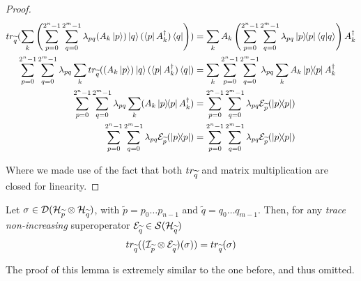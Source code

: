 \begin{proof}
\begin{align*}
\trQ(\sum_k  \left( \sum_{p = 0}^{2^n-1} \sum_{q = 0}^{2^m-1} \lambda_{pq} (A_k\ket{p})\ket{q}(\bra{p}A_k^\dagger) \bra{q} \right) )
&= \sum_k A_k\left( \sum_{p = 0}^{2^n-1} \sum_{q = 0}^{2^m-1} \lambda_{pq} \proj{p}\braket{q | q}\right)A_k^\dagger
\\
\sum_{p = 0}^{2^n-1} \sum_{q = 0}^{2^m-1} \lambda_{pq} \sum_k \trQ( (A_k\ket{p})\ket{q}(\bra{p}A_k^\dagger) \bra{q} ) 
&= \sum_k  \sum_{p = 0}^{2^n-1} \sum_{q = 0}^{2^m-1} \lambda_{pq} \sum_k  A_k \proj{p} A_k^\dagger 
\\
\sum_{p = 0}^{2^n-1} \sum_{q = 0}^{2^m-1} \lambda_{pq} \sum_k (A_k \proj{p} A_k^\dagger) 
&=  \sum_{p = 0}^{2^n-1} \sum_{q = 0}^{2^m-1} \lambda_{pq} \sop_{\widetilde{p}} (\proj{p})
\\
\sum_{p = 0}^{2^n-1} \sum_{q = 0}^{2^m-1} \lambda_{pq} \sop_{\widetilde{p}}(\proj{p})
&=  \sum_{p = 0}^{2^n-1} \sum_{q = 0}^{2^m-1} \lambda_{pq} \sop_{\widetilde{p}} (\proj{p})
\end{align*}

Where we made use of the fact that both $tr_{\widetilde{q}}$ and matrix multiplication are closed for linearity.
\end{proof}

\begin{lemma}\label{trace_and_sop_2}
Let $\sigma \in  \mathcal{D}(\mathcal{H}_{\widetilde{p}} \otimes \mathcal{H}_{\widetilde{q}})$, with $\widetilde{p} = p_0 \ldots p_{n-1}$ and $\widetilde{q} = q_0 \ldots q_{m-1}$. Then, for any \textit{trace non-increasing} superoperator $\mathcal{E}_{\widetilde{q}} \in \mathcal{S}(\mathcal{H}_{\widetilde{q}})$
\[ tr_{\widetilde{q}}((\mathcal{I}_{\widetilde{p}} \otimes \mathcal{E}_{\widetilde{q}})(\sigma)) = tr_{\widetilde{q}}(\sigma)
\]
\end{lemma}

The proof of this lemma is extremely similar to the one before, and thus omitted. 


